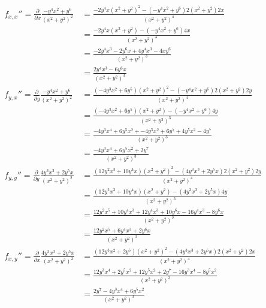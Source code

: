 \documentclass{article}
\newcommand{\p}[1]{\frac{\partial}{\partial #1}}
\begin{document}
\begin{gather*}
\begin{aligned}
f_{x,x}''=\p{x}\frac{-y^4x^2+y^6}{(x^2+y^2)^2}&=\frac{-2y^4x(x^2+y^2)^2-(-y^4x^2+y^6)2(x^2+y^2)2x}{(x^2+y^2)^4}\\
&=\frac{-2y^4x(x^2+y^2)-(-y^4x^2+y^6)4x}{(x^2+y^2)^3}\\
&=\frac{-2y^4x^3-2y^6x+4y^4x^3-4xy^6}{(x^2+y^2)^3}\\
&=\frac{2y^4x^3-6y^6x}{(x^2+y^2)^3}\\
f_{y,x}''=\p{y}\frac{-y^4x^2+y^6}{(x^2+y^2)^2}&=\frac{(-4y^3x^2+6y^5)(x^2+y^2)^2-(-y^4x^2+y^6)2(x^2+y^2)2y}{(x^2+y^2)^4}\\
&=\frac{(-4y^3x^2+6y^5)(x^2+y^2)-(-y^4x^2+y^6)4y}{(x^2+y^2)^3}\\
&=\frac{-4y^3x^4+6y^5x^2+-4y^5x^2+6y^7+4y^5x^2-4y^7}{(x^2+y^2)^3}\\
&=\frac{-4y^3x^4+6y^5x^2+2y^7}{(x^2+y^2)^3}\\
f_{y,y}''=\p{y}\frac{4y^3x^3+2y^5x}{(x^2+y^2)^2}&=\frac{(12y^2x^3+10y^4x)(x^2+y^2)^2-(4y^3x^3+2y^5x)2(x^2+y^2)2y}{(x^2+y^2)^4}\\
&=\frac{(12y^2x^3+10y^4x)(x^2+y^2)-(4y^3x^3+2y^5x)4y}{(x^2+y^2)^3}\\
&=\frac{12y^2x^5+10y^4x^3+12y^4x^3+10y^6x-16y^4x^3-8y^6x}{(x^2+y^2)^3}\\
&=\frac{12y^2x^5+6y^4x^3+2y^6x}{(x^2+y^2)^3}\\
f_{x,y}''=\p{x}\frac{4y^3x^3+2y^5x}{(x^2+y^2)^2}&=\frac{(12y^3x^2+2y^5)(x^2+y^2)^2-(4y^3x^3+2y^5x)2(x^2+y^2)2x}{(x^2+y^2)^4}\\
&=\frac{12y^3x^4+2y^5x^2+12y^5x^2+2y^7-16y^3x^4-8y^5x^2}{(x^2+y^2)^3}\\
&=\frac{2y^7-4y^3x^4+6y^5x^2}{(x^2+y^2)^3}\\
\end {aligned}
\end{gather*}
\end{document}
